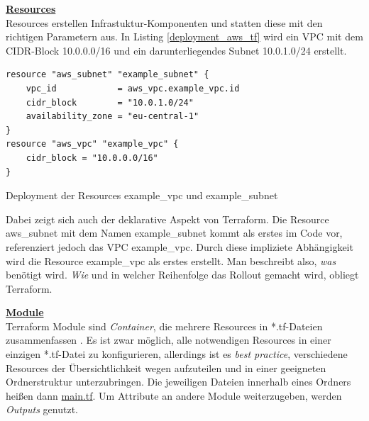 \textbf{\underline{Resources}}\\
Resources erstellen Infrastuktur-Komponenten und statten diese mit den richtigen Parametern aus. In Listing \ref{deployment_aws_tf} wird ein \gls{VPC} mit dem \gls{CIDR}-Block 10.0.0.0/16 und ein darunterliegendes Subnet 10.0.1.0/24 erstellt.
\begin{listing}[h]
\begin{verbatim}
resource "aws_subnet" "example_subnet" {
    vpc_id            = aws_vpc.example_vpc.id
    cidr_block        = "10.0.1.0/24"
    availability_zone = "eu-central-1"
}
resource "aws_vpc" "example_vpc" {
    cidr_block = "10.0.0.0/16"
}
\end{verbatim}
\caption{Deployment der Resources \glqq example\_vpc\grqq{} und \glqq example\_subnet\grqq{}}
\label{deployment_aws_tf}
\end{listing}
Dabei zeigt sich auch der deklarative Aspekt von Terraform. Die Resource \glqq aws\_subnet\grqq{} mit dem Namen \glqq example\_subnet\grqq{} kommt als erstes im Code vor, referenziert jedoch das \gls{VPC} \glqq example\_vpc\grqq{}. Durch diese impliziete Abhängigkeit wird die Resource \glqq example\_vpc\grqq{} als erstes erstellt. Man beschreibt also, \textit{was} benötigt wird. \textit{Wie} und in welcher Reihenfolge das Rollout gemacht wird, obliegt Terraform.

\textbf{\underline{Module}}\\
Terraform Module sind \textit{Container}, die mehrere Resources in *.tf-Dateien zusammenfassen \cite{tfmodule2021}. Es ist zwar möglich, alle notwendigen Resources in einer einzigen *.tf-Datei zu konfigurieren, allerdings ist es \textit{best practice}, verschiedene Resources der Übersichtlichkeit wegen aufzuteilen und in einer geeigneten Ordnerstruktur unterzubringen. Die jeweiligen Dateien innerhalb eines Ordners heißen dann \underline{main.tf}. Um Attribute an andere Module weiterzugeben, werden \textit{Outputs} genutzt. 

